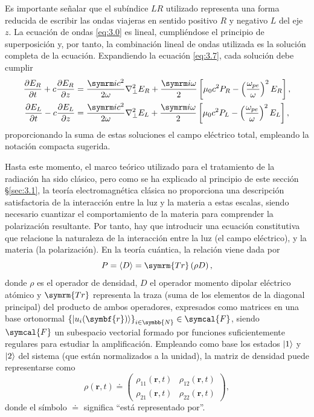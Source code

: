 Es importante señalar que el subíndice $LR$ utilizado representa una forma reducida de escribir las ondas viajeras en sentido positivo $R$ y negativo $L$ del eje $z$. La ecuación de ondas \eqref{eq:3.0} es lineal, cumpliéndose el principio de superposición y, por tanto, la combinación lineal de ondas utilizada es la solución completa de la ecuación. Expandiendo la ecuación \eqref{eq:3.7}, cada solución debe cumplir
\begin{align}
  \pdv{E_{R}}{t} + c \pdv{E_{R}}{z} &= \frac{\iu c^{2}}{2 \omega}\laplacian_{\perp}E_{R} + \frac{\iu \omega}{2} \left[\mu_{0}c^{2}P_{R} - \left(\frac{\omega_{pe}}{\omega}\right)^{2}E_{R}\right], \\
  \pdv{E_{L}}{t} - c \pdv{E_{L}}{z} &= \frac{\iu c^{2}}{2 \omega}\laplacian_{\perp}E_{L} + \frac{\iu \omega}{2} \left[\mu_{0}c^{2}P_{L} - \left(\frac{\omega_{pe}}{\omega}\right)^{2}E_{L}\right],
\end{align}
proporcionando la suma de estas soluciones el campo eléctrico total, empleando la notación compacta sugerida.

Hasta este momento, el marco teórico utilizado para el tratamiento de la radiación ha sido clásico, pero como se ha explicado al principio de este sección \S\ref{sec:3.1}, la teoría electromagnética clásica no proporciona una descripción satisfactoria \autocite{Griffiths2017} de la interacción entre la luz y la materia a estas escalas, siendo necesario cuantizar el comportamiento de la materia para comprender la polarización resultante. Por tanto, hay que introducir una ecuación constitutiva que relacione la naturaleza de la interacción entre la luz (el campo eléctrico), y la materia (la polarización). En la teoría cuántica, la relación \autocite{Cohen-Tannoudji2019} viene dada por
\begin{equation}\label{eq:3.8}
  P = \xval{D} = \symrm{Tr} \left(\rho D \right),
\end{equation}
donde $\rho$ es el operador de densidad, $D$ el operador momento dipolar eléctrico atómico y $\symrm{Tr}$ representa la traza (suma de los elementos de la diagonal principal) del producto de ambos operadores, expresados como matrices en una base ortonormal $\left\{\ket{u_{i}(\symbf{r})}\right\}_{i \in \symbb{N}} \in \symcal{F}$, siendo $\symcal{F}$ un subespacio vectorial \autocite{Cohen-Tannoudji2019} formado por funciones suficientemente regulares para estudiar la amplificación. Empleando como base los estados $|1\rangle$ y $|2\rangle$ del sistema (que están normalizados a la unidad), la matriz de densidad puede representarse como
\begin{equation}\label{eq:3.9}
  \rho(\symbf{r},t) \doteq  
  \begin{pmatrix}
    \rho_{11}(\symbf{r},t) & \rho_{12}(\symbf{r},t) \\
    \rho_{21}(\symbf{r},t) & \rho_{22}(\symbf{r},t)
  \end{pmatrix},
\end{equation}
donde el símbolo $\doteq $ significa \enquote{está representado por}.

